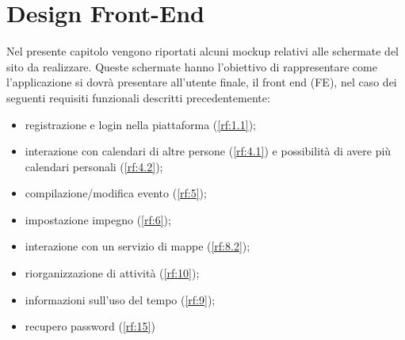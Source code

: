 \section{Design Front-End}
\label{sec:RequisitiFrontEnd}

Nel presente capitolo vengono riportati alcuni mockup relativi alle schermate del sito da realizzare. Queste schermate hanno l’obiettivo di rappresentare come l’applicazione si dovrà presentare all’utente finale, il front end (FE), nel caso dei seguenti requisiti funzionali descritti precedentemente: 
\begin{itemize}
    \item registrazione e login nella piattaforma (\ref{rf:1.1});
    \item interazione con calendari di altre persone (\ref{rf:4.1}) e possibilità di avere più calendari personali (\ref{rf:4.2});
    \item compilazione/modifica evento (\ref{rf:5});
    \item impostazione impegno (\ref{rf:6});
    \item interazione con un servizio di mappe (\ref{rf:8.2});
    \item riorganizzazione di attività (\ref{rf:10});
    \item informazioni sull’uso del tempo (\ref{rf:9});
    \item recupero password (\ref{rf:15}) %
\end{itemize}

